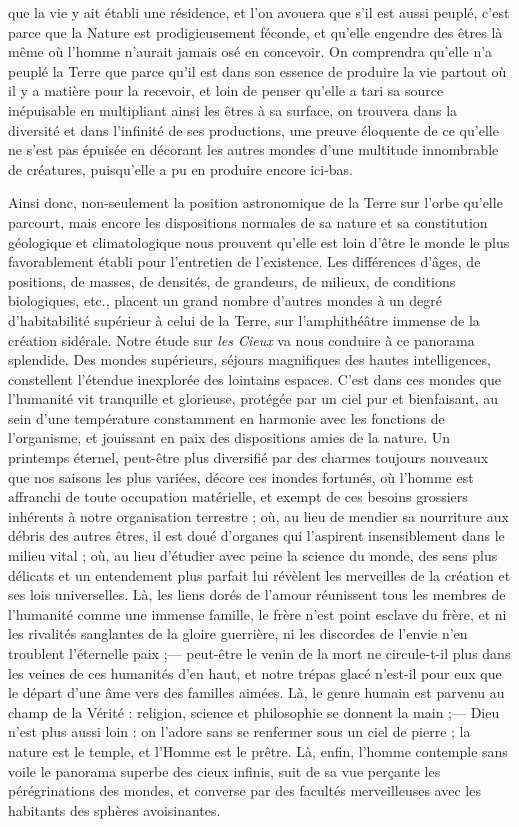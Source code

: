 \documentclass[a4paper, 11pt, oneside, landscape]{article}
\begin{document}
que la vie y ait établi une résidence, et l'on avouera que s'il est aussi peuplé, c'est parce que la Nature est prodigieusement féconde, et qu'elle engendre des êtres là même où l'homme n'aurait jamais osé en concevoir. On comprendra qu'elle n'a peuplé la Terre que parce qu'il est dans son essence de produire la vie partout où il y a matière pour la recevoir, et loin de penser qu'elle a tari sa source inépuisable en multipliant ainsi les êtres à sa surface, on trouvera dans la diversité et dans l'infinité de ses productions, une preuve éloquente de ce qu'elle ne s'est pas épuisée en décorant les autres mondes d'une multitude innombrable de créatures, puisqu'elle a pu en produire encore ici-bas.

Ainsi donc, non-seulement la position astronomique de la Terre sur l'orbe qu'elle parcourt, mais encore les dispositions normales de sa nature et sa constitution géologique et climatologique nous prouvent qu'elle est loin d'être le monde le plus favorablement établi pour l'entretien de l'existence. Les différences d'âges, de positions, de masses, de densités, de grandeurs, de milieux, de conditions biologiques, etc., placent un grand nombre d'autres mondes à un degré d'habitabilité supérieur à celui de la Terre, sur l'amphithéâtre immense de la création sidérale. Notre étude sur \emph{les Cieux} va nous conduire à ce panorama splendide. Des mondes supérieurs, séjours magnifiques des hautes intelligences, constellent l'étendue inexplorée des lointains espaces. C'est dans ces mondes que l'humanité vit tranquille et glorieuse, protégée par un ciel pur et bienfaisant, au sein d'une température constamment en harmonie avec les fonctions de l'organisme, et jouissant en paix des dispositions amies de la nature. Un printemps éternel, peut-être plus diversifié par des charmes toujours nouveaux que nos saisons les plus variées, décore ces inondes fortunés, où l'homme est affranchi de toute occupation matérielle, et exempt de ces besoins grossiers inhérents à notre organisation terrestre ; où, au lieu de mendier sa nourriture aux débris des autres êtres, il est doué d'organes qui l'aspirent insensiblement dans le milieu vital ; où, au lieu d'étudier avec peine la science du monde, des sens plus délicats et un entendement plus parfait lui révèlent les merveilles de la création et ses lois universelles. Là, les liens dorés de l'amour réunissent tous les membres de l'humanité comme une immense famille, le frère n'est point esclave du frère, et ni les rivalités sanglantes de la gloire guerrière, ni les discordes de l'envie n'en troublent l'éternelle paix ;--- peut-être le venin de la mort ne circule-t-il plus dans les veines de ces humanités d'en haut, et notre trépas glacé n'est-il pour eux que le départ d'une âme vers des familles aimées. Là, le genre humain est parvenu au champ de la Vérité : religion, science et philosophie se donnent la main ;--- Dieu n'est plus aussi loin : on l'adore sans se renfermer sous un ciel de pierre ; la nature est le temple, et l'Homme est le prêtre. Là, enfin, l'homme contemple sans voile le panorama superbe des cieux infinis, suit de sa vue perçante les pérégrinations des mondes, et converse par des facultés merveilleuses avec les habitants des sphères avoisinantes.
\clearpage
\end{document}

